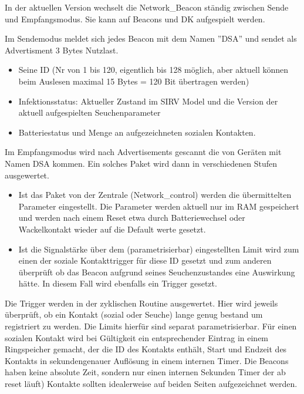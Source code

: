 \documentclass[11pt,ngerman]{scrartcl} %
\begin{document}
In der aktuellen Version wechselt die Network\_Beacon ständig zwischen Sende und Empfangsmodus. Sie kann auf Beacons und DK aufgespielt werden.

Im Sendemodus  meldet sich jedes Beacon mit dem Namen ''DSA'' und sendet als Advertisment 3 Bytes Nutzlast. 
\begin{itemize}
\item Seine ID (Nr von 1 bis 120, eigentlich bis 128 möglich, aber aktuell können beim Auslesen maximal 15 Bytes = 120 Bit übertragen werden)
\item Infektionsstatus: Aktueller Zustand im SIRV Model und die Version der aktuell aufgespielten Seuchenparameter
\item Batteriestatus und Menge an aufgezeichneten sozialen Kontakten.
\end{itemize}

Im Empfangsmodus wird nach Advertisements gescannt die von Geräten mit Namen DSA kommen. Ein solches Paket wird dann in verschiedenen Stufen ausgewertet.
\begin{itemize}
\item Ist das Paket von der Zentrale (Network\_control) werden die übermittelten Parameter eingestellt. Die Parameter werden aktuell nur im RAM gespeichert und werden nach einem Reset etwa durch Batteriewechsel oder Wackelkontakt wieder auf die Default werte gesetzt. 
\item Ist die Signalstärke über dem (parametrisierbar) eingestellten Limit wird zum einen der soziale Kontakttrigger für diese ID gesetzt und zum anderen überprüft ob das Beacon aufgrund seines Seuchenzustandes eine Auswirkung hätte. In diesem Fall wird ebenfalls ein Trigger gesetzt.
\end{itemize}
Die Trigger werden in der zyklischen Routine ausgewertet. Hier wird jeweils überprüft, ob ein Kontakt (sozial oder Seuche) lange genug bestand um registriert zu werden. Die Limits hierfür sind separat parametrisierbar. Für einen sozialen Kontakt wird bei Gültigkeit ein entsprechender Eintrag in einem Ringspeicher gemacht, der die ID des Kontakts enthält, Start und Endzeit des Kontakts in sekundengenauer Auflösung in einem internen Timer. Die Beacons haben keine absolute Zeit, sondern nur einen internen Sekunden Timer der ab reset läuft) Kontakte sollten idealerweise auf beiden Seiten aufgezeichnet werden.
\end{document}
